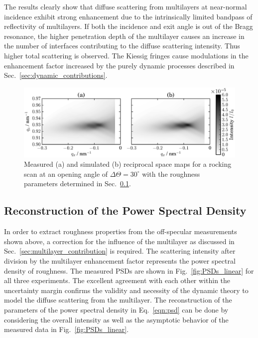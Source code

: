 \documentclass[twocolumn,osajnl,showpacs,superscriptaddress,11pt]{revtex4-1}
\begin{document}
The results clearly show that diffuse scattering from multilayers at near-normal incidence exhibit strong enhancement due to the intrinsically limited bandpass of reflectivity of multilayers. If both the incidence and exit angle is out of the Bragg resonance, the higher penetration depth of the multilayer causes an increase in the number of interfaces contributing to the diffuse scattering intensity. Thus higher total scattering is observed. The Kiessig fringes cause modulations in the enhancement factor increased by the purely dynamic processes described in Sec.~\ref{sec:dynamic_contributions}.

\begin{figure}
        \includegraphics[width=
        \textwidth]{simulation_vs_measurement} \caption{Measured (a) and simulated (b) reciprocal space maps for a rocking scan at an opening angle of $\Delta\Theta=30^\circ$ with the roughness parameters determined in Sec.~\ref{sec:determination_of_the_psd}.} \label{fig:comparisonWithTheory} 
\end{figure}

\subsection{Reconstruction of the Power Spectral Density} \label{sec:determination_of_the_psd} In order to extract roughness properties from the off-specular measurements shown above, a correction for the influence of the multilayer as discussed in Sec.~\ref{sec:multilayer_contribution} is required. The scattering intensity after division by the multilayer enhancement factor represents the power spectral density of roughness. The measured PSDs are shown in Fig.~\ref{fig:PSDs_linear} for all three experiments. The excellent agreement with each other within the uncertainty margin confirms the validity and necessity of the dynamic theory to model the diffuse scattering from the multilayer. The reconstruction of the parameters of the power spectral density in Eq.~\eqref{eqn:psd} can be done by considering the overall intensity as well as the asymptotic behavior \cite{PhysRevB.54.5860} of the measured data in Fig.~\ref{fig:PSDs_linear}.
\end{document}
